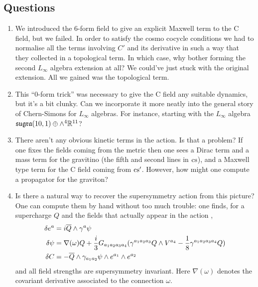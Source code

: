 \documentclass[10pt, oneside]{article}
\begin{document}
\subsection{Questions}
\vspace{-8pt}
\begin{enumerate}
 \item We introduced the 6-form field to give an explicit Maxwell term to the C field, but we failed.  In order to satisfy the cosmo cocycle conditions we had to normalise all the terms involving $C'$ and its derivative in such a way that they collected in a topological term.  In which case, why bother forming the second $L_\infty$ algebra extension at all?  We could've just stuck with the original extension.  All we gained was the topological term.
 \item This ``0-form trick'' was necessary to give the C field any suitable dynamics, but it's a bit clunky.  Can we incorporate it more neatly into the general story of Chern-Simons for $L_\infty$ algebras.  For instance, starting with the $L_\infty$ algebra $\mathfrak{sugra}(10,1) \oplus \wedge^4 \mathbb{R}^{11}$?
 \item There aren't any obvious kinetic terms in the action.  Is that a problem?  If one fixes the fields coming from the metric then one sees a Dirac term and a mass term for the gravitino (the fifth and second lines in $\mathrm{cs}$), and a Maxwell type term for the C field coming from $\mathrm{cs}'$.  However, how might one compute a propagator for the graviton?
 \item Is there a natural way to recover the supersymmetry action from this picture?  One can compute them by hand without too much trouble: one finds, for a supercharge $Q$ and the fields that actually appear in the action \cite{FreGrassi}, 
 \begin{align*}
  \delta e^a &= i \overline{Q} \wedge \gamma^a \psi \\
  \delta \psi &= \nabla(\omega) Q + \frac i3 G_{a_1 a_2 a_3 a_4} (\gamma^{a_1 a_2 a_3} Q \wedge V^{a_4} - \frac 18 \gamma^{a_1 a_2 a_3 a_4} Q) \\
  \delta C &= -\overline{Q} \wedge \gamma_{a_1 a_2} \psi \wedge e^{a_1} \wedge e^{a_2}
 \end{align*}
 and all field strengths are supersymmetry invariant.  Here $\nabla(\omega)$ denotes the covariant derivative associated to the connection $\omega$.
\end{enumerate}
\end{document}
